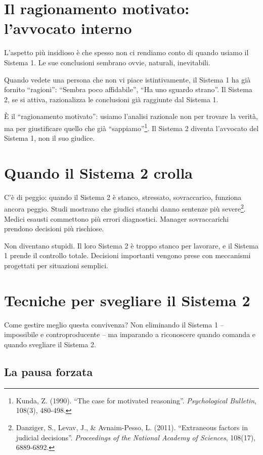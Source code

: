 \section{Il ragionamento motivato: l'avvocato interno}

L'aspetto più insidioso è che spesso non ci rendiamo conto di quando usiamo il Sistema 1. Le sue conclusioni sembrano ovvie, naturali, inevitabili.

Quando vedete una persona che non vi piace istintivamente, il Sistema 1 ha già fornito ``ragioni'': ``Sembra poco affidabile'', ``Ha uno sguardo strano''. Il Sistema 2, se si attiva, razionalizza le conclusioni già raggiunte dal Sistema 1.

È il ``ragionamento motivato'': usiamo l'analisi razionale non per trovare la verità, ma per giustificare quello che già ``sappiamo''\footnote{Kunda, Z. (1990). ``The case for motivated reasoning''. \textit{Psychological Bulletin}, 108(3), 480-498.}. Il Sistema 2 diventa l'avvocato del Sistema 1, non il suo giudice.

\section{Quando il Sistema 2 crolla}

C'è di peggio: quando il Sistema 2 è stanco, stressato, sovraccarico, funziona ancora peggio. Studi mostrano che giudici stanchi danno sentenze più severe\footnote{Danziger, S., Levav, J., \& Avnaim-Pesso, L. (2011). ``Extraneous factors in judicial decisions''. \textit{Proceedings of the National Academy of Sciences}, 108(17), 6889-6892.}. Medici esausti commettono più errori diagnostici. Manager sovraccarichi prendono decisioni più rischiose.

Non diventano stupidi. Il loro Sistema 2 è troppo stanco per lavorare, e il Sistema 1 prende il controllo totale. Decisioni importanti vengono prese con meccanismi progettati per situazioni semplici.

\section{Tecniche per svegliare il Sistema 2}

Come gestire meglio questa convivenza? Non eliminando il Sistema 1 -- impossibile e controproducente -- ma imparando a riconoscere quando comanda e quando svegliare il Sistema 2.

\subsection{La pausa forzata}

